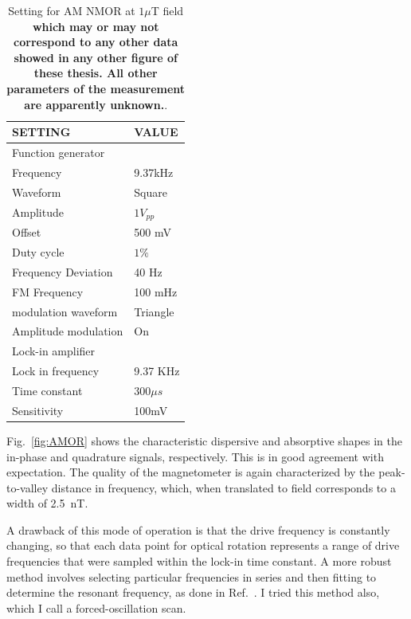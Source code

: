 \begin{table}%
\centering
\begin{tabular}{|l |l|}
\hline

\textbf{ SETTING}    & \textbf{VALUE} \\
\hline
Function generator &   \\
\hline
Frequency & 9.37kHz   \\

Waveform    &  Square  \\

Amplitude   &  $1V_{pp}$  \\
Offset  &       500 mV  \\
Duty cycle       &    $1\%$ \\
Frequency Deviation     &   40 Hz  \\
FM Frequency     &   100 mHz  \\
modulation waveform      &    Triangle \\
Amplitude modulation & On \\
\hline
Lock-in amplifier &     \\
\hline
Lock in frequency     & 9.37 KHz \\
Time constant     &  $300\mu s$ \\
Sensitivity      &  100mV  \\
\hline
\end{tabular}
\caption{Setting for AM NMOR at $1\mu$T field {\bf which may or may
    not correspond to any other data showed in any other figure of
    these thesis.  All other parameters of the measurement are
    apparently unknown.}.\label{tab:freqsweep}}
\end{table}

Fig.~\ref{fig:AMOR} shows the characteristic dispersive and absorptive
shapes in the in-phase and quadrature signals, respectively.  This is
in good agreement with expectation.  The quality of the magnetometer
is again characterized by the peak-to-valley distance in frequency,
which, when translated to field corresponds to a width of 2.5~nT.

A drawback of this mode of operation is that the drive frequency is
constantly changing, so that each data point for optical rotation
represents a range of drive frequencies that were sampled within the
lock-in time constant.  A more robust method involves selecting
particular frequencies in series and then fitting to determine the
resonant frequency, as done in Ref.~\cite{bib:michithesis}.  I tried
this method also, which I call a forced-oscillation scan.

